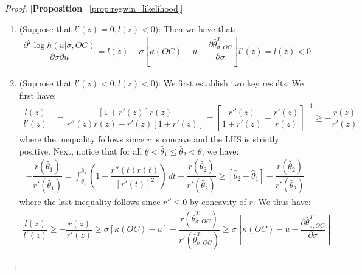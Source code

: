 \begin{proof}{[\textbf{Proposition} ~\ref{prop:regwin_likelihood}]}
\begin{enumerate}[label=(\arabic*),ref=\thelemma(\arabic*)]
\begin{gather*}
  \end{gather*}
  We thus have that:
  \begin{align}\label{eq:spec}
      0\geq r''(z)r(z) \geq r'(z)[1+r'(z)] \geq 0
  \end{align}
  where the first inequality follows since $r$ is concave, the second inequality follows since $l'(z)\leq 0$, and the third inequality follows since $l(z)\geq 0$ implies that $r'(z)+1\leq 0$. Thus, we have that $r'(z)=-1$ or $r'(z) = 0$. In the latter case, since $r'(z)+1\leq 0$ we have $1\leq0$, yielding a contradiction. Thus, it must be that $r'(z)=-1$ and $l(z)=0$. But \eqref{eq:spec} implies that $l'(z)=0$, thus we have that:
  \begin{align*}
      \dfrac{\partial^2 \log h(u|\sigma,OC)}{\partial \sigma \partial u} &= l(z) - \sigma\left[\kappa(OC)-u-\dfrac{\partial \hat{\theta}^T_{\sigma,OC}}{\partial \sigma}\right]l'(z) = 0
  \end{align*}
  \item (Suppose that $l'(z)= 0, l(z) < 0$): Then we have that:
  \begin{align*}
    \dfrac{\partial^2 \log h(u|\sigma,OC)}{\partial \sigma \partial u} = l(z) - \sigma\left[\kappa(OC)-u-\dfrac{\partial \hat{\theta}^T_{\sigma,OC}}{\partial \sigma}\right]l'(z) = l(z) < 0
  \end{align*}
  \item (Suppose that $l'(z)< 0, l(z) < 0$): We first establish two key results. We first have:
  \begin{align}\label{eq:ineq3_concave}
  \dfrac{l(z)}{l'(z)} &= \dfrac{[1+r'(z)]r(z)}{r''(z)r(z) - r'(z)[1+r'(z)]} = \left[\dfrac{r''(z)}{1+r'(z)} - \dfrac{r'(z)}{r(z)}\right]^{-1} \geq -\dfrac{r(z)}{r'(z)}
  \end{align}
  where the inequality follows since $r$ is concave and the LHS is strictly positive. Next, notice that for all $\underline{\theta}<\hat{\theta}_1\leq \hat{\theta}_2<\bar{\theta}$, we have:
  \begin{align}\label{eq:ineq4_concave}
      -\dfrac{r(\hat{\theta}_1)}{r'(\hat{\theta}_1)} = \int_{\hat{\theta}_1}^{\hat{\theta}_2}\left(1-\dfrac{r''(t)r(t)}{[r'(t)]^2}\right) \,dt - \dfrac{r(\hat{\theta}_2)}{r'(\hat{\theta}_2)} \geq [\hat{\theta}_2 - \hat{\theta}_1] - \dfrac{r(\hat{\theta}_2)}{r'(\hat{\theta}_2)} 
  \end{align}
  where the last inequality follows since $r''\leq0$ by concavity of $r$. We thus have:
  \begin{align*}
      \dfrac{l(z)}{l'(z)} \geq  -\dfrac{r(z)}{r'(z)} \geq \sigma[\kappa(OC)-u] - \dfrac{r(\hat{\theta}^T_{\sigma,OC})}{r'(\hat{\theta}^T_{\sigma,OC})} \geq \sigma\left[\kappa(OC)-u-\dfrac{\partial \hat{\theta}^T_{\sigma,OC}}{\partial \sigma}\right] 

\end{align*}
\end{enumerate}
\end{proof}
